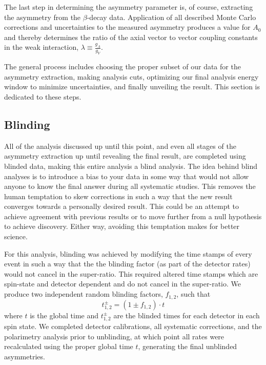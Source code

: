 The last step in determining the asymmetry parameter is, of course, extracting the
asymmetry from the $\beta$-decay data. Application of all described Monte Carlo
corrections and uncertainties to the measured asymmetry produces a value for
$A_0$ and thereby determines the ratio of the axial vector to vector coupling
constants in the weak interaction, $\lambda \equiv \frac{g_A}{g_V}$.

The general process includes choosing the proper subset of our data for the
asymmetry extraction, making analysis cuts, optimizing our final analysis energy
window to minimize uncertainties, and finally unveiling the result. This section
is dedicated to these steps.

\subsection{Blinding}
All of the analysis discussed up until this point, and even all stages of the
asymmetry extraction up until revealing the final result,
are completed using blinded data, making this entire
analysis a blind analysis. The idea behind blind analyses
is to introduce a bias to your data in some way
that would not allow anyone to know the final answer during all systematic studies. This
removes the human temptation to skew corrections in such a way that the new result
converges towards a personally desired result. This could be an attempt to achieve agreement
with previous results or to move further from a null hypothesis to achieve discovery.
Either way, avoiding this temptation makes for better science.

For this analysis, blinding was achieved by modifying the time stamps of every event
in such a way that the the blinding factor (as part of the
detector rates) would not cancel in the super-ratio. This required
altered time stamps which are spin-state and detector
dependent and do not cancel in the super-ratio. We produce two independent
random blinding factors, $f_{1,2}$, such that
%
\begin{equation}
  t^{\pm}_{1,2} = (1 \pm f_{1,2}) \cdot t
\end{equation}
%
\noindent where $t$ is the global time
and $t^{\pm}_{1,2}$ are the blinded times for each detector in each spin state. We completed
detector calibrations, all systematic corrections, and the polarimetry analysis prior to
unblinding, at which point all rates were recalculated using the proper global time $t$,
generating the final unblinded asymmetries.

